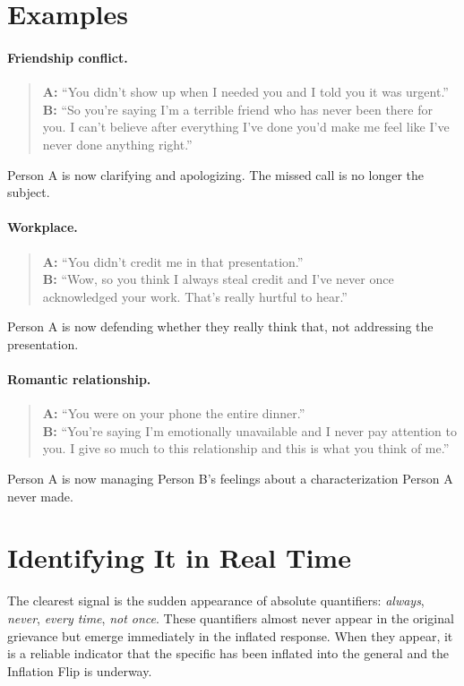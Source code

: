 \section{Examples}

\paragraph{Friendship conflict.}
\begin{quote}
\textbf{A:} ``You didn't show up when I needed you and I told you it was urgent.''\\
\textbf{B:} ``So you're saying I'm a terrible friend who has never been there for you. I can't believe after everything I've done you'd make me feel like I've never done anything right.''
\end{quote}
Person A is now clarifying and apologizing.
The missed call is no longer the subject.

\paragraph{Workplace.}
\begin{quote}
\textbf{A:} ``You didn't credit me in that presentation.''\\
\textbf{B:} ``Wow, so you think I always steal credit and I've never once acknowledged your work. That's really hurtful to hear.''
\end{quote}
Person A is now defending whether they really think that, not addressing the presentation.

\paragraph{Romantic relationship.}
\begin{quote}
\textbf{A:} ``You were on your phone the entire dinner.''\\
\textbf{B:} ``You're saying I'm emotionally unavailable and I never pay attention to you. I give so much to this relationship and this is what you think of me.''
\end{quote}
Person A is now managing Person B's feelings about a characterization Person A never made.

\section{Identifying It in Real Time}

\begin{remark}
The clearest signal is the sudden appearance of absolute quantifiers: \emph{always}, \emph{never}, \emph{every time}, \emph{not once}.
These quantifiers almost never appear in the original grievance but emerge immediately in the inflated response.
When they appear, it is a reliable indicator that the specific has been inflated into the general and the Inflation Flip is underway.
\end{remark}


